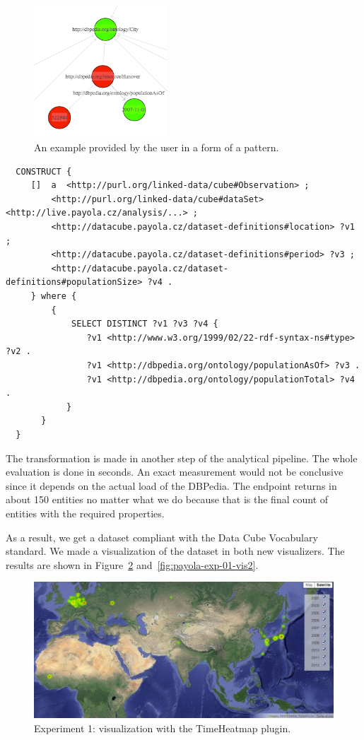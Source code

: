 \begin{figure}
  \centering
  \includegraphics[width=50mm]{img/payola-exp-01-selection.png}
  \caption{An example provided by the user in a form of a pattern.}
  \label{fig:payola-exp-01-selection}
\end{figure}

\scriptsize
\begin{verbatim}
  CONSTRUCT {
     []  a  <http://purl.org/linked-data/cube#Observation> ;
         <http://purl.org/linked-data/cube#dataSet> <http://live.payola.cz/analysis/...> ;
         <http://datacube.payola.cz/dataset-definitions#location> ?v1 ;
         <http://datacube.payola.cz/dataset-definitions#period> ?v3 ;
         <http://datacube.payola.cz/dataset-definitions#populationSize> ?v4 .
     } where {
         {
             SELECT DISTINCT ?v1 ?v3 ?v4 {
                ?v1 <http://www.w3.org/1999/02/22-rdf-syntax-ns#type> ?v2 .
                ?v1 <http://dbpedia.org/ontology/populationAsOf> ?v3 .
                ?v1 <http://dbpedia.org/ontology/populationTotal> ?v4 .
            }
       }
  } 
\end{verbatim}
\normalsize

The transformation is made in another step of the analytical pipeline. The 
whole evaluation is done in seconds. An exact measurement would not be 
conclusive since it depends on the actual load of the DBPedia. The endpoint 
returns in about 150 entities no matter what we do because that is the final
count of entities with the required properties.

As a result, we get a dataset compliant with the Data Cube Vocabulary standard. 
We made a visualization of the dataset in both new visualizers. The results are 
shown in Figure~\ref{fig:payola-exp-01-vis} and~\ref{fig:payola-exp-01-vis2}.

\begin{figure}
  \centering
  \includegraphics[width=140mm]{img/payola-exp-01-vis.png}
  \caption{Experiment 1: visualization with the TimeHeatmap plugin.}
  \label{fig:payola-exp-01-vis}
\end{figure}

